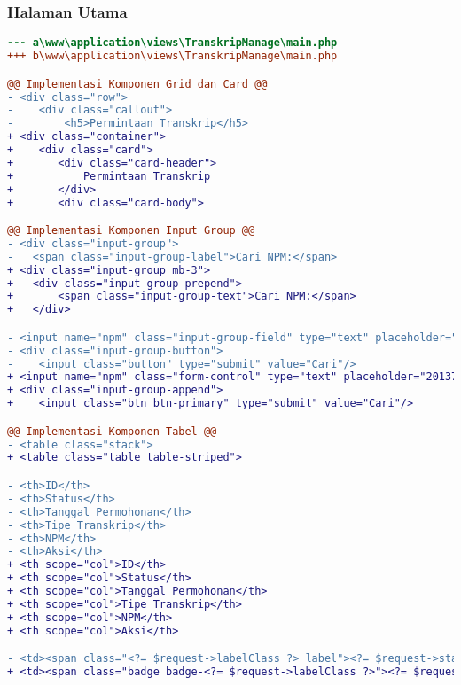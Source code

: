 \subsubsection{Halaman Utama}
\begin{lstlisting}[language=diff, caption=Perubahan file \path{\views\TranskripManage\main.php}, label=Entri, basicstyle=\ttfamily, frame=single,
columns=fullflexible, keepspaces=true, breaklines=true]
--- a\www\application\views\TranskripManage\main.php
+++ b\www\application\views\TranskripManage\main.php

@@ Implementasi Komponen Grid dan Card @@
- <div class="row">
-    <div class="callout">
-        <h5>Permintaan Transkrip</h5>
+ <div class="container">
+    <div class="card">
+    	<div class="card-header">
+    		Permintaan Transkrip
+    	</div>
+    	<div class="card-body">

@@ Implementasi Komponen Input Group @@ 
- <div class="input-group">
- 	<span class="input-group-label">Cari NPM:</span>
+ <div class="input-group mb-3">
+ 	<div class="input-group-prepend">
+   	<span class="input-group-text">Cari NPM:</span>
+ 	</div>

- <input name="npm" class="input-group-field" type="text" placeholder="2013730013" maxlength="10" minlength="10"<?= $npmQuery === NULL ? '' : " value='$npmQuery'" ?>/>
- <div class="input-group-button">
-    <input class="button" type="submit" value="Cari"/>
+ <input name="npm" class="form-control" type="text" placeholder="2013730013" maxlength="10" minlength="10"<?= $npmQuery === NULL ? '' : " value='$npmQuery'" ?>/>
+ <div class="input-group-append">
+    <input class="btn btn-primary" type="submit" value="Cari"/>

@@ Implementasi Komponen Tabel @@ 
- <table class="stack">
+ <table class="table table-striped">

- <th>ID</th>
- <th>Status</th>
- <th>Tanggal Permohonan</th>
- <th>Tipe Transkrip</th>
- <th>NPM</th>
- <th>Aksi</th>
+ <th scope="col">ID</th>
+ <th scope="col">Status</th>
+ <th scope="col">Tanggal Permohonan</th>
+ <th scope="col">Tipe Transkrip</th>
+ <th scope="col">NPM</th>
+ <th scope="col">Aksi</th>

- <td><span class="<?= $request->labelClass ?> label"><?= $request->status ?></span></td>
+ <td><span class="badge badge-<?= $request->labelClass ?>"><?= $request->status ?></span></td>


\end{lstlisting}
